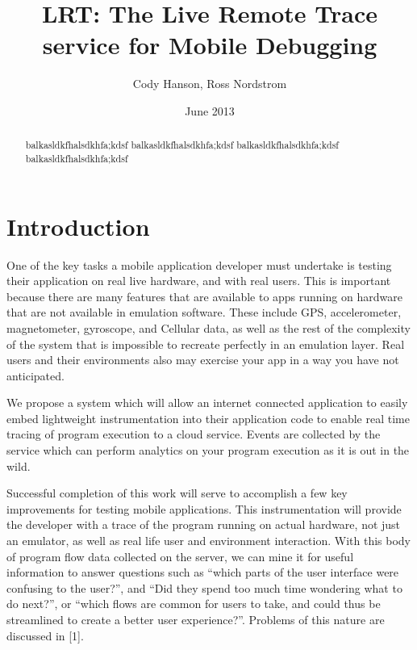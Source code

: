 \documentclass[11pt]{article}
\begin{document}
\title{LRT: The Live Remote Trace service for Mobile Debugging}
\author{Cody Hanson, Ross Nordstrom}
\date{June 2013}

\maketitle

\begin{abstract}
balkasldkfhalsdkhfa;kdsf
balkasldkfhalsdkhfa;kdsf
balkasldkfhalsdkhfa;kdsf
balkasldkfhalsdkhfa;kdsf

\end{abstract}

\section{Introduction}
One of the key tasks a mobile application developer must undertake is testing 
their application on real live hardware, and with real users. This is important 
because there are many features that are available to apps running on hardware 
that are not available in emulation software. These include GPS, accelerometer, 
magnetometer, gyroscope, and Cellular data, as well as the rest of the 
complexity of the system that is impossible to recreate perfectly in an 
emulation layer. Real users and their environments also may exercise your app in
a way you have not anticipated. 

We propose a system which will allow an internet connected application to easily
embed lightweight instrumentation into their application code to enable real 
time tracing of program execution to a cloud service. Events are collected by 
the service which can perform analytics on your program execution as it is out 
in the wild.

Successful completion of this work will serve to accomplish a few key 
improvements for testing mobile applications. This instrumentation will provide 
the developer with a trace of the program running on actual hardware, not just 
an emulator, as well as real life user and environment interaction. With this 
body of program flow data collected on the server, we can mine it for useful 
information to answer questions such as “which parts of the user interface were 
confusing to the user?”, and “Did they spend too much time wondering what to do 
next?”, or “which flows are common for users to take, and could thus be 
streamlined to create a better user experience?”. Problems of this nature are 
discussed in [1].
\end{document}
